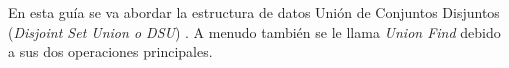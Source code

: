 En esta guía se va abordar la estructura de datos Unión de Conjuntos Disjuntos (\emph{Disjoint Set Union o DSU}) . A menudo también se le llama \emph{Union Find} debido a sus dos operaciones principales. 